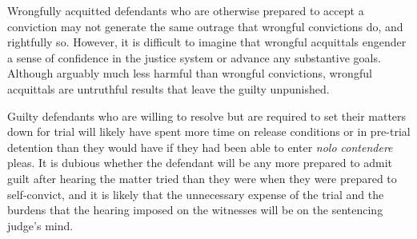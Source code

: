Wrongfully acquitted defendants who are otherwise prepared to accept a conviction may not generate the same outrage that wrongful convictions do, and rightfully so. However, it is difficult to imagine that wrongful acquittals engender a sense of confidence in the justice system or advance any substantive goals. Although arguably much less harmful than wrongful convictions, wrongful acquittals are untruthful results that leave the guilty unpunished. 

Guilty defendants who are willing to resolve but are required to set their matters down for trial will likely have spent more time on release conditions or in pre-trial detention than they would have if they had been able to enter \textit{nolo contendere} pleas. It is dubious whether the defendant will be any more prepared to admit guilt after hearing the matter tried than they were when they were prepared to self-convict, and it is likely that the unnecessary expense of the trial and the burdens that the hearing imposed on the witnesses will be on the sentencing judge's mind. 

